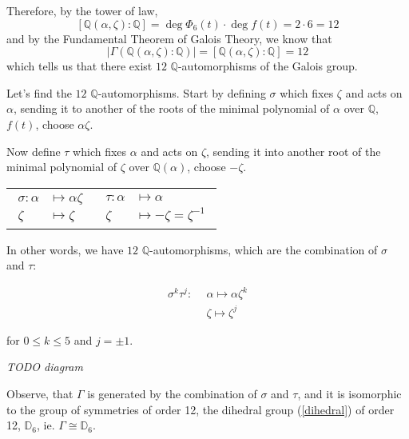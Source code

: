 \documentclass{article}
\theoremstyle{definition}
\begin{document}
\vspace{0.5cm}
Therefore, by the tower of law,
$$[\mathbb{Q}(\alpha, \zeta) : \mathbb{Q}] = \deg{\Phi_6(t)} \cdot \deg{f(t)} = 2 \cdot 6 = 12$$
and by the Fundamental Theorem of Galois Theory, we know that
$$|\Gamma( \mathbb{Q}(\alpha, \zeta) : \mathbb{Q} )| = [\mathbb{Q}(\alpha, \zeta) : \mathbb{Q}] = 12$$
which tells us that there exist $12$ $\mathbb{Q}$-automorphisms of the Galois group.


\vspace{0.5cm}
Let's find the $12$ $\mathbb{Q}$-automorphisms. Start by defining $\sigma$ which
fixes $\zeta$ and acts on $\alpha$, sending it to another of the roots of the
minimal polynomial of $\alpha$ over $\mathbb{Q}$, $f(t)$, choose $\alpha \zeta$.

Now define $\tau$ which fixes $\alpha$ and acts on $\zeta$, sending it into
another root of the minimal polynomial of $\zeta$ over $\mathbb{Q}(\alpha)$,
choose $-\zeta$.

\vspace{0.3cm}
\begin{tabular}{@{}l l@{}}
    $\begin{aligned}
      \sigma: \alpha &\mapsto \alpha \zeta \\
      \zeta &\mapsto \zeta
    \end{aligned}$
  &
    $\begin{aligned}
      \tau: \alpha &\mapsto \alpha\\
      \zeta &\mapsto -\zeta = \zeta^{-1}
    \end{aligned}$
\end{tabular}

In other words, we have $12$ $\mathbb{Q}$-automorphisms, which are the
combination of $\sigma$ and $\tau$:

$$\begin{aligned}
  \sigma^k \tau^j:~~&\alpha \mapsto \alpha \zeta^k\\
		    &\zeta \mapsto \zeta^j
\end{aligned}$$

for $0 \leq k \leq 5$ and $j = \pm 1$.

\vspace{0.5cm}
\emph{TODO diagram}
\vspace{0.5cm}

Observe, that $\Gamma$ is generated by the combination of $\sigma$ and $\tau$,
and it is isomorphic to the group of symmetries of order 12, the dihedral
group (\ref{dihedral}) of order 12, $\mathbb{D}_6$, ie. $\Gamma \cong \mathbb{D}_6$.
\end{document}
